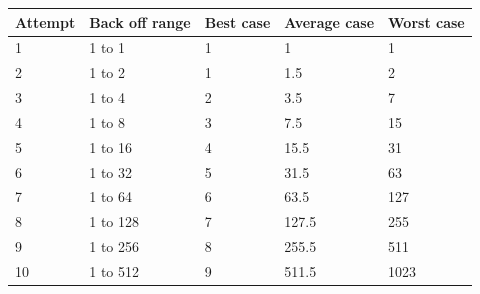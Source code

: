 \begin{table}[ht!]
\centering
\begin{tabular}{ l l l l l }
Attempt                                                                & Back off range                                         & Best case                                       & Average case                                        & Worst case \\ \hline 
\multicolumn{1}{l}{1}                        & \multicolumn{1}{l}{1 to 1}    & \multicolumn{1}{l}{1}  & \multicolumn{1}{l}{1}      & 1          \\
\multicolumn{1}{l}{2}                                                & \multicolumn{1}{l}{1 to 2}                            & \multicolumn{1}{l}{1}                          & \multicolumn{1}{l}{1.5}                            & 2          \\
 
\multicolumn{1}{l}{{ 3}} & \multicolumn{1}{l}{1 to 4}    & \multicolumn{1}{l}{2}  & \multicolumn{1}{l}{3.5}    & 7          \\
\multicolumn{1}{l}{4}                                                & \multicolumn{1}{l}{1 to 8}                            & \multicolumn{1}{l}{3}                          & \multicolumn{1}{l}{7.5}                            & 15         \\
 
\multicolumn{1}{l}{5}                        & \multicolumn{1}{l}{1 to 16}   & \multicolumn{1}{l}{4}  & \multicolumn{1}{l}{15.5}   & 31         \\
\multicolumn{1}{l}{6}                                                & \multicolumn{1}{l}{1 to 32}                           & \multicolumn{1}{l}{5}                          & \multicolumn{1}{l}{31.5}                           & 63         \\
 
\multicolumn{1}{l}{7}                        & \multicolumn{1}{l}{1 to 64}   & \multicolumn{1}{l}{6}  & \multicolumn{1}{l}{63.5}   & 127        \\
\multicolumn{1}{l}{8}                                                & \multicolumn{1}{l}{1 to 128}                          & \multicolumn{1}{l}{7}                          & \multicolumn{1}{l}{127.5}                          & 255        \\
 
\multicolumn{1}{l}{9}                        & \multicolumn{1}{l}{1 to 256}  & \multicolumn{1}{l}{8}  & \multicolumn{1}{l}{255.5}  & 511        \\
\multicolumn{1}{l}{10}                                               & \multicolumn{1}{l}{1 to 512}                          & \multicolumn{1}{l}{9}                          & \multicolumn{1}{l}{511.5}                          & 1023       \\
 

\end{tabular}
\end{table}
